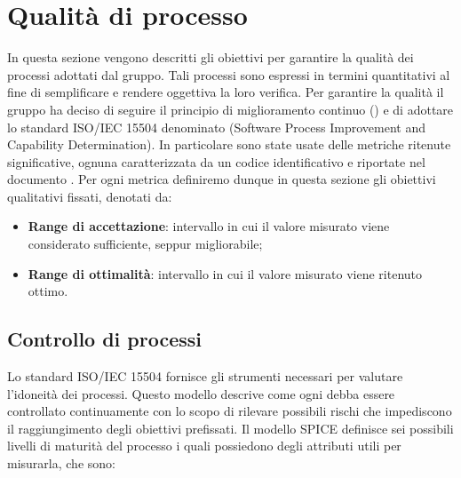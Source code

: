 \section{Qualità di processo}
In questa sezione vengono descritti gli obiettivi per garantire la qualità dei processi adottati dal gruppo. 
Tali processi sono espressi in termini quantitativi al fine di semplificare
e rendere oggettiva la loro verifica.
Per garantire la qualità il gruppo ha deciso di seguire il principio di miglioramento continuo () e di adottare lo standard ISO/IEC 15504 denominato  (Software Process Improvement and Capability Determination).
In particolare sono state usate delle metriche ritenute significative, ognuna caratterizzata da un codice identificativo e riportate nel documento
\docNameNdP{}.  Per ogni metrica definiremo dunque in questa sezione gli obiettivi qualitativi fissati, denotati da:
\begin{itemize}
    \item \textbf{Range di accettazione}: intervallo in cui il valore misurato viene considerato sufficiente, seppur migliorabile;

    \item \textbf{Range di ottimalità}: intervallo in cui il valore misurato viene ritenuto ottimo.
    
\end{itemize}

    \subsection{Controllo di processi}
    
    Lo standard ISO/IEC 15504 fornisce gli strumenti necessari per valutare l’idoneità dei processi. 
    Questo modello descrive come ogni  debba essere controllato continuamente con lo scopo di rilevare possibili rischi che impediscono il raggiungimento degli obiettivi prefissati.
    Il modello SPICE definisce sei possibili livelli di maturità del processo 
    i quali possiedono degli attributi utili per misurarla, che sono:

